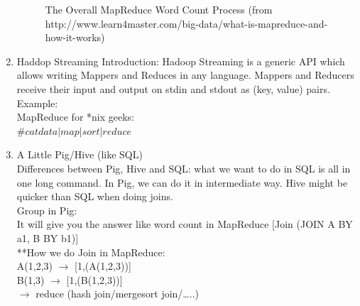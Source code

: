 \begin{enumerate}
\begin{figure}[ht]
\begin{center}
      \caption{
        The Overall MapReduce Word Count Process (from http://www.learn4master.com/big-data/what-is-mapreduce-and-how-it-works)}
      \label{fig:example_figure}
    \end{center}
  \end{figure}
  \item Haddop Streaming
  Introduction: Hadoop Streaming is a generic API which allows writing Mappers and Reduces in any language. Mappers and Reducers receive their input and output on stdin and stdout as (key, value) pairs.\\
  Example: \\
  MapReduce for *nix geeks:\\
  $\#cat  data | map | sort | reduce$
  \item A Little Pig/Hive (like SQL)\\
  Differences between Pig, Hive and SQL: what we want to do in SQL is all in one long command. In Pig, we can do it in intermediate way. Hive might be quicker than SQL when doing joins. \\
  Group in Pig:\\ 
  It will give you the answer like word count in MapReduce 
  [Join (JOIN A BY a1, B BY b1)]\\
  **How we do Join in MapReduce:\\
  A(1,2,3) $\rightarrow$ [1,(A(1,2,3))]\\
  B(1,3) $\rightarrow$ [1,(B(1,2,3))]\\
  $\rightarrow$ reduce (hash join/mergesort join/…..)
\end{enumerate}
